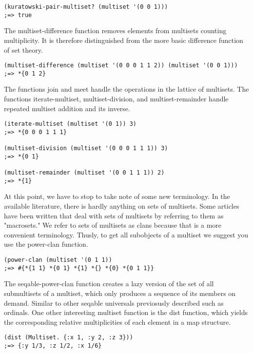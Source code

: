 \documentclass[a4paper,11pt]{report}
\begin{document}
\lstset {language=Lisp}
\begin{lstlisting}
(kuratowski-pair-multiset? (multiset '(0 0 1)))
;=> true
\end{lstlisting}

\newpage

The multiset-difference function removes elements from multisets counting multiplicity. It is therefore distinguished from the more basic difference function of set theory.

\lstset {language=Lisp}
\begin{lstlisting}
(multiset-difference (multiset '(0 0 0 1 1 2)) (multiset '(0 0 1)))
;=> *{0 1 2}
\end{lstlisting}

The functions join and meet handle the operations in the lattice of multisets. The functions iterate-multiset, multiset-division, and multiset-remainder handle repeated multiset addition and its inverse.

\lstset {language=Lisp}
\begin{lstlisting}
(iterate-multiset (multiset '(0 1)) 3)
;=> *{0 0 0 1 1 1}

(multiset-division (multiset '(0 0 0 1 1 1)) 3)
;=> *{0 1}

(multiset-remainder (multiset '(0 0 1 1 1)) 2)
;=> *{1}
\end{lstlisting}

At this point, we have to stop to take note of some new terminology. In the available literature, there is hardly anything on sets of multisets. Some articles have been written that deal with sets of multisets by referring to them as "macrosets." We refer to sets of multisets as clans because that is a more convenient terminology. Thusly, to get all subobjects of a multiset we suggest you use the power-clan function.

\lstset {language=Lisp}
\begin{lstlisting}
(power-clan (multiset '(0 1 1))
;=> #{*{1 1} *{0 1} *{1} *{} *{0} *{0 1 1}}
\end{lstlisting}

The seqable-power-clan function creates a lazy version of the set of all submultisets of a multiset, which only produces a sequence of its members on demand. Similar to other seqable universals previosusly described such as ordinals. One other interesting multiset function is the dist function, which yields the corresponding relative multiplicities of each element in a map structure.

\lstset {language=Lisp}
\begin{lstlisting}
(dist (Multiset. {:x 1, :y 2, :z 3}))
;=> {:y 1/3, :z 1/2, :x 1/6}
\end{lstlisting}
\end{document}
